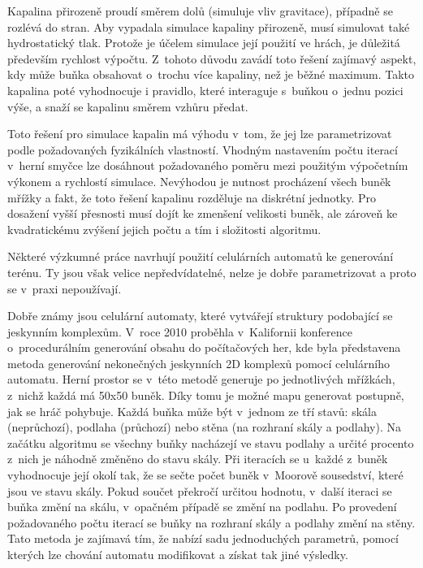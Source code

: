 Kapalina přirozeně proudí směrem dolů (simuluje vliv gravitace), případně se rozlévá do stran.
Aby vypadala simulace kapaliny přirozeně, musí simulovat také hydrostatický tlak.
Protože je účelem simulace její použití ve hrách, je důležitá především rychlost výpočtu.
Z~tohoto důvodu zavádí toto řešení zajímavý aspekt, kdy může buňka obsahovat o~trochu více kapaliny, než je běžné maximum.
Takto  kapalina poté vyhodnocuje i pravidlo, které interaguje s~buňkou o~jednu pozici výše, a snaží se kapalinu směrem vzhůru předat.
\par
Toto řešení pro simulace kapalin má výhodu v~tom, že jej lze parametrizovat podle požadovaných fyzikálních vlastností.
Vhodným nastavením počtu iterací v~herní smyčce lze dosáhnout požadovaného poměru mezi použitým výpočetním výkonem a rychlostí simulace.
Nevýhodou je nutnost procházení všech buněk mřížky a fakt, že toto řešení kapalinu rozděluje na diskrétní jednotky.
Pro dosažení vyšší přesnosti musí dojít ke zmenšení velikosti buněk, ale zároveň ke kvadratickému zvýšení jejich počtu a tím i složitosti algoritmu.
\par
Některé výzkumné práce navrhují použití celulárních automatů ke generování terénu.
Ty jsou však velice nepředvídatelné, nelze je dobře parametrizovat a proto se v~praxi nepoužívají.
\par
Dobře známy jsou celulární automaty, které vytvářejí struktury podobající se jeskynním komplexům.
V~roce 2010 proběhla v~Kalifornii konference o~procedurálním generování obsahu do počítačových her, kde byla představena metoda generování nekonečných jeskynních 2D komplexů pomocí celulárního automatu\cite{lit:cellular_cave}.
Herní prostor se v~této metodě generuje po jednotlivých mřížkách, z~nichž každá má 50x50 buněk.
Díky tomu je možné mapu generovat postupně, jak se hráč pohybuje.
Každá buňka může být v~jednom ze tří stavů: skála (neprůchozí), podlaha (průchozí) nebo stěna (na rozhraní skály a podlahy).
Na začátku algoritmu se všechny buňky nacházejí ve stavu podlahy a určité procento z~nich je náhodně změněno do stavu skály.
Při iteracích se u~každé z~buněk vyhodnocuje její okolí tak, že se sečte počet buněk v~Moorově sousedství, které jsou ve stavu skály.
Pokud součet překročí určitou hodnotu, v~další iteraci se buňka změní na skálu, v~opačném případě se změní na podlahu.
Po provedení požadovaného počtu iterací se buňky na rozhraní skály a podlahy změní na stěny.
Tato metoda je zajímavá tím, že nabízí sadu jednoduchých parametrů, pomocí kterých lze chování automatu modifikovat a získat tak jiné výsledky.
